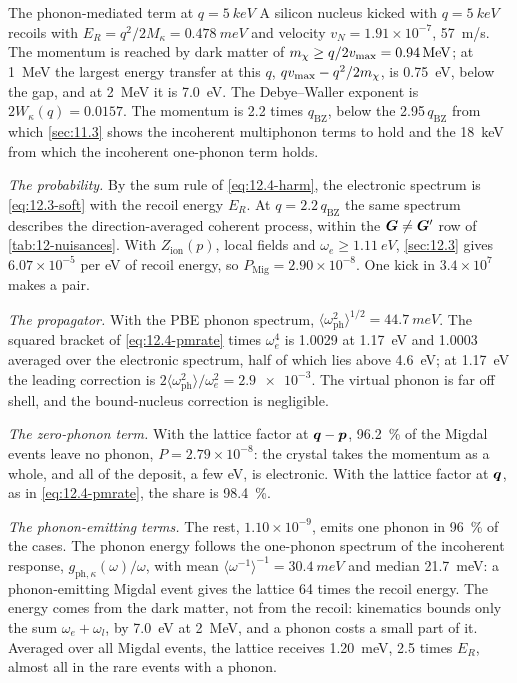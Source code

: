 \begin{workedexample}{The phonon-mediated term at $q = \SI{5}{keV}$}\label{we:12-five-keV}
A silicon nucleus kicked with $q = \SI{5}{keV}$ recoils with $E_R = q^2/2M_\kappa = \SI{0.478}{meV}$ and velocity $v_N = 1.91\times10^{-7}$, \SI{57}{m/s}. The momentum is reached by dark matter of $m_{\chi} \ge q/2v_{\mathrm{max}} = \SI{0.94}{MeV}$; at \SI{1}{MeV} the largest energy transfer at this $q$, $qv_{\mathrm{max}} - q^2/2m_{\chi}$, is \SI{0.75}{eV}, below the gap, and at \SI{2}{MeV} it is \SI{7.0}{eV}. The Debye--Waller exponent is $2W_\kappa(q) = 0.0157$. The momentum is 2.2 times $q_{\mathrm{BZ}}$, below the 2.95\,$q_{\mathrm{BZ}}$ from which \cref{sec:11.3} shows the incoherent multiphonon terms to hold and the \SI{18}{keV} from which the incoherent one-phonon term holds.

\emph{The probability.} By the sum rule of \cref{eq:12.4-harm}, the electronic spectrum is \cref{eq:12.3-soft} with the recoil energy $E_R$. At $q = 2.2\,q_{\mathrm{BZ}}$ the same spectrum describes the direction-averaged coherent process, within the $\bm{G} \neq \bm{G}'$ row of \cref{tab:12-nuisances}. With $Z_{\mathrm{ion}}(p)$, local fields and $\omega_e \ge \SI{1.11}{eV}$, \cref{sec:12.3} gives $6.07\times10^{-5}$ per eV of recoil energy, so $P_{\mathrm{Mig}} = 2.90\times10^{-8}$. One kick in $3.4\times10^7$ makes a pair.

\emph{The propagator.} With the PBE phonon spectrum, $\langle\omega_{\mathrm{ph}}^2\rangle^{1/2} = \SI{44.7}{meV}$. The squared bracket of \cref{eq:12.4-pmrate} times $\omega_e^4$ is 1.0029 at \SI{1.17}{eV} and 1.0003 averaged over the electronic spectrum, half of which lies above \SI{4.6}{eV}; at \SI{1.17}{eV} the leading correction is $2\langle\omega_{\mathrm{ph}}^2\rangle/\omega_e^2 = \num{2.9e-3}$. The virtual phonon is far off shell, and the bound-nucleus correction is negligible.

\emph{The zero-phonon term.} With the lattice factor at $\bm{q} - \bm{p}$, \SI{96.2}{\percent} of the Migdal events leave no phonon, $P = 2.79\times10^{-8}$: the crystal takes the momentum as a whole, and all of the deposit, a few eV, is electronic. With the lattice factor at $\bm{q}$, as in \cref{eq:12.4-pmrate}, the share is \SI{98.4}{\percent}.

\emph{The phonon-emitting terms.} The rest, $1.10\times10^{-9}$, emits one phonon in \SI{96}{\percent} of the cases. The phonon energy follows the one-phonon spectrum of the incoherent response, $g_{\mathrm{ph},\kappa}(\omega)/\omega$, with mean $\langle\omega^{-1}\rangle^{-1} = \SI{30.4}{meV}$ and median \SI{21.7}{meV}: a phonon-emitting Migdal event gives the lattice 64 times the recoil energy. The energy comes from the dark matter, not from the recoil: kinematics bounds only the sum $\omega_e + \omega_l$, by \SI{7.0}{eV} at \SI{2}{MeV}, and a phonon costs a small part of it. Averaged over all Migdal events, the lattice receives \SI{1.20}{meV}, 2.5 times $E_R$, almost all in the rare events with a phonon.


\end{workedexample}
